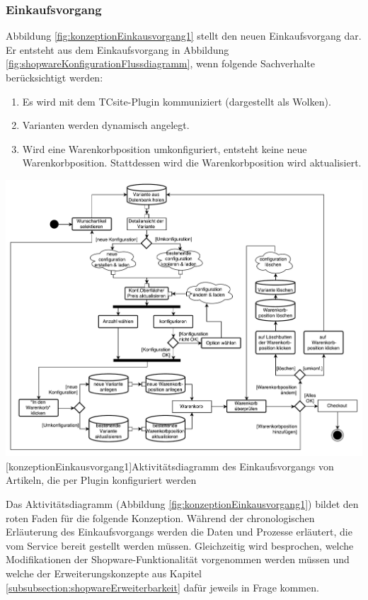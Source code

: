 \documentclass[12pt,a4paper,bibliography=totocnumbered,listof=totoc]{scrartcl}
\begin{document}
\subsubsection{Einkaufsvorgang}
Abbildung \ref{fig:konzeptionEinkausvorgang1} stellt den neuen Einkaufsvorgang dar. Er entsteht aus dem Einkaufsvorgang in Abbildung \ref{fig:shopwareKonfigurationFlussdiagramm}, wenn folgende Sachverhalte berücksichtigt werden:
\begin{enumerate}
\item Es wird mit dem TCsite-Plugin kommuniziert (dargestellt als Wolken).
\item Varianten werden dynamisch angelegt.
\item Wird eine Warenkorbposition umkonfiguriert, entsteht keine neue Warenkorbposition. Stattdessen wird die Warenkorbposition wird aktualisiert.
\end{enumerate}

\vspace{1em}
\begin{minipage}{\linewidth}
	\centering
	\includegraphics[width=1\linewidth]{Abbildungen/konzeptionEinkausvorgang1.pdf}
	[konzeptionEinkausvorgang1]{Aktivitätsdiagramm des Einkaufsvorgangs von Artikeln, die per Plugin konfiguriert werden}
	\label{fig:konzeptionEinkausvorgang1}
\end{minipage}
\vspace{1em}

Das Aktivitätsdiagramm (Abbildung \ref{fig:konzeptionEinkausvorgang1}) bildet den \glqq roten Faden\grqq{} für die folgende Konzeption. Während der chronologischen Erläuterung des Einkaufsvorgangs werden die Daten und Prozesse erläutert, die vom Service bereit gestellt werden müssen. Gleichzeitig wird besprochen, welche Modifikationen der Shopware-Funktionalität vorgenommen werden müssen und welche der Erweiterungskonzepte aus Kapitel \ref{subsubsection:shopwareErweiterbarkeit} dafür jeweils in Frage kommen.
\end{document}
